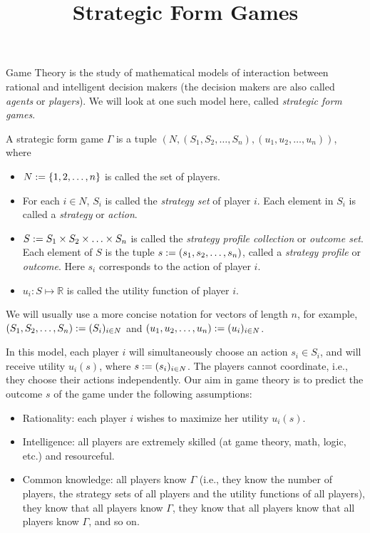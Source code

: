 
\usepackage{diagbox}
\usepackage{tikz}
\usetikzlibrary{arrows.meta}


\title{Strategic Form Games}



\maketitle
\initMinimal{}

Game Theory is the study of mathematical models of interaction
between rational and intelligent decision makers
(the decision makers are also called \emph{agents} or \emph{players}).
We will look at one such model here, called \emph{strategic form games}.

A strategic form game $\Gamma$ is a tuple
$(N, (S_1, S_2, \ldots, S_n), (u_1, u_2, \ldots, u_n))$, where
\begin{itemize}
\item $N := \{1, 2, \ldots, n\}$ is called the set of players.
\item For each $i \in N$, $S_i$ is called the \emph{strategy set} of player $i$.
    Each element in $S_i$ is called a \emph{strategy} or \emph{action}.
\item $S := S_1 \times S_2 \times \ldots \times S_n$ is called the
    \emph{strategy profile collection} or \emph{outcome set}.
    Each element of $S$ is the tuple $s := (s_1, s_2, \ldots, s_n)$,
    called a \emph{strategy profile} or \emph{outcome}.
    Here $s_i$ corresponds to the action of player $i$.
\item $u_i: S \mapsto \mathbb{R}$ is called the utility function of player $i$.
\end{itemize}

We will usually use a more concise notation for vectors of length $n$, for example,\\
$(S_1, S_2, \ldots, S_n) := (S_i)_{i \in N}$
and $(u_1, u_2, \ldots, u_n) := (u_i)_{i \in N}$.

In this model, each player $i$ will simultaneously choose an action $s_i \in S_i$,
and will receive utility $u_i(s)$, where $s := (s_i)_{i \in N}$.
The players cannot coordinate, i.e., they choose their actions independently.
Our aim in game theory is to predict the outcome $s$ of the game
under the following assumptions:
\begin{itemize}
\item Rationality: each player $i$ wishes to maximize her utility $u_i(s)$.
\item Intelligence: all players are extremely skilled (at game theory, math, logic, etc.)
    and resourceful.
\item Common knowledge: all players know $\Gamma$
    (i.e., they know the number of players, the strategy sets of all players
    and the utility functions of all players), they know that all players know $\Gamma$,
    they know that all players know that all players know $\Gamma$, and so on.
\end{itemize}

